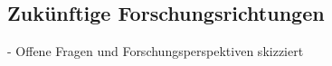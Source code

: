 \subsection{Zukünftige Forschungsrichtungen} \label{sec:Zukünftige Forschungsrichtungen}

- Offene Fragen und Forschungsperspektiven skizziert